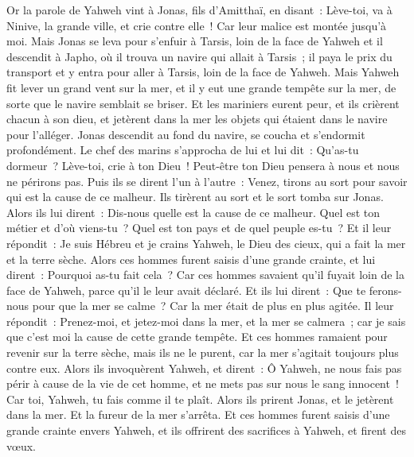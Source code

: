 \begin{multicols}{2}
\VerseOne{}Or la parole de Yahweh vint à Jonas, fils d'Amitthaï, en disant~:
Lève-toi, va à Ninive, la grande ville, et crie contre elle~! Car leur malice est montée jusqu'à moi.
Mais Jonas se leva pour s'enfuir à Tarsis, loin de la face de Yahweh et il descendit à Japho, où il trouva un navire qui allait à Tarsis~; il paya le prix du transport et y entra pour aller à Tarsis, loin de la face de Yahweh.
Mais Yahweh fit lever un grand vent sur la mer, et il y eut une grande tempête sur la mer, de sorte que le navire semblait se briser.
Et les mariniers eurent peur, et ils crièrent chacun à son dieu, et jetèrent dans la mer les objets qui étaient dans le navire pour l'alléger. Jonas descendit au fond du navire, se coucha et s'endormit profondément.
Le chef des marins s'approcha de lui et lui dit~: Qu'as-tu dormeur~? Lève-toi, crie à ton Dieu~! Peut-être ton Dieu pensera à nous et nous ne périrons pas.
Puis ils se dirent l'un à l'autre~: Venez, tirons au sort pour savoir qui est la cause de ce malheur. Ils tirèrent au sort et le sort tomba sur Jonas.
Alors ils lui dirent~: Dis-nous quelle est la cause de ce malheur. Quel est ton métier et d'où viens-tu~? Quel est ton pays et de quel peuple es-tu~?
Et il leur répondit~: Je suis Hébreu et je crains Yahweh, le Dieu des cieux, qui a fait la mer et la terre sèche.
Alors ces hommes furent saisis d'une grande crainte, et lui dirent~: Pourquoi as-tu fait cela~? Car ces hommes savaient qu'il fuyait loin de la face de Yahweh, parce qu'il le leur avait déclaré.
Et ils lui dirent~: Que te ferons-nous pour que la mer se calme~? Car la mer était de plus en plus agitée.
Il leur répondit~: Prenez-moi, et jetez-moi dans la mer, et la mer se calmera~; car je sais que c'est moi la cause de cette grande tempête.
Et ces hommes ramaient pour revenir sur la terre sèche, mais ils ne le purent, car la mer s'agitait toujours plus contre eux.
Alors ils invoquèrent Yahweh, et dirent~: Ô Yahweh, ne nous fais pas périr à cause de la vie de cet homme, et ne mets pas sur nous le sang innocent~! Car toi, Yahweh, tu fais comme il te plaît.
Alors ils prirent Jonas, et le jetèrent dans la mer. Et la fureur de la mer s'arrêta.
Et ces hommes furent saisis d'une grande crainte envers Yahweh, et ils offrirent des sacrifices à Yahweh, et firent des vœux.

\end{multicols}
